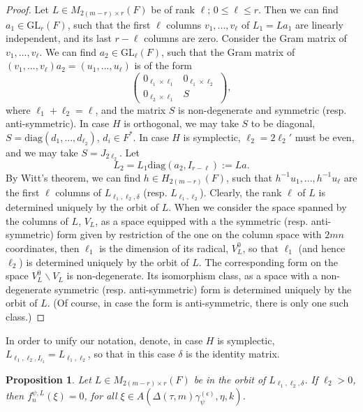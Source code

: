 \documentclass[12pts]{amsart}
\newcommand{\diag}{{\mathrm{diag}}}
\newcommand{\GL}{{\mathrm{GL}}}
\newtheorem{prop}[thm]{Proposition}
\begin{document}
\begin{proof}
	Let $L\in M_{2(m-r)\times r}(F)$ be of rank $\ell$; $0\leq \ell\leq
	r$. Then we can find $a_1\in \GL_r(F)$, such that the first
	$\ell$ columns $v_1,...,v_\ell$ of $L_1=La_1$ are linearly
	independent, and its last $r-\ell$ columns are zero. Consider the
	Gram matrix of $v_1,...,v_\ell$. We can find $a_2 \in
	\GL_\ell(F)$, such that the Gram matrix of
	$(v_1,...,v_\ell)a_2=(u_1,...,u_\ell)$ is of the form
	$$
	\begin{pmatrix}0_{\ell_1\times\ell_1}&0_{\ell_1\times\ell_2}\\
	0_{\ell_2\times\ell_1}&S\end{pmatrix},
	$$
	where $\ell_1+\ell_2=\ell$, and the matrix $S$ is non-degenerate and symmetric (resp. anti-symmetric). In case $H$ is orthogonal, we may take $S$ to be diagonal, $S=\diag(d_1,...,d_{\ell_2})$, $d_i\in F^*$. In case $H$ is symplectic, $\ell_2=2\ell_2'$ must be even, and we may take $S=J_{2\ell_2}$. Let
	$$
	L_2=L_1\diag (a_2,I_{r-\ell}):=La.
	$$
	By Witt's theorem, we can
	find $h\in H_{2(m-r)}(F)$, such that $h^{-1}
	u_1,...,h^{-1} u_\ell$ are the first $\ell$ columns of
	$L_{\ell_1,\ell_2,\delta}$ (resp. $L_{\ell_1,\ell_2}$). Clearly, the rank $\ell$ of $L$ is determined uniquely by the orbit of $L$. When we consider the space spanned by the columns of $L$, $V_L$, as a space equipped with a the symmetric (resp. anti-symmetric) form given by restriction of the one on the column space with $2mn$ coordinates, then $\ell_1$ is the dimension of its radical, $V_L^0$, so that $\ell_1$ (and hence $\ell_2$) is determined uniquely by the orbit of $L$. The corresponding form on the space $V^0_L\backslash V_L$ is non-degenerate. Its isomorphism class, as a space with a non-degenerate symmetric (resp. anti-symmetric) form is determined uniquely by the orbit of $L$. (Of course, in case the form is anti-symmetric, there is only one such class.)
\end{proof}
In order to unify our notation, denote, in case $H$ is symplectic, $L_{\ell_1,\ell_2,I_{\ell_2}}=L_{\ell_1,\ell_2}$, so that in this case $\delta$ is the identity matrix. 
\begin{prop}\label{prop 9.4}
	Let $L\in M_{2(m-r)\times r}(F)$ be in the orbit of $L_{\ell_1,\ell_2,\delta}$. If $\ell_2>0$, then $f_n^{\psi,L}(\xi)=0$, for all $\xi\in A(\Delta(\tau,m)\gamma_\psi^{(\epsilon)},\eta,k)$.
	\end{prop}
\end{document}
